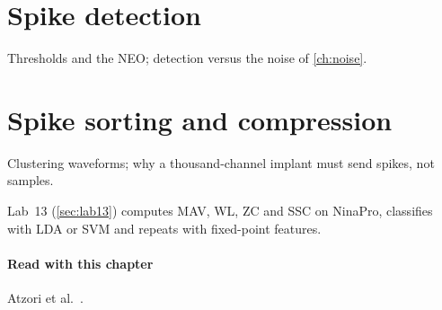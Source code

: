 \section{Spike detection}\label{sec:ch26-3}
Thresholds and the NEO; detection versus the noise of \cref{ch:noise}.

\section{Spike sorting and compression}\label{sec:ch26-4}
Clustering waveforms; why a thousand-channel implant must send spikes, not samples.

\begin{tryit}
Lab~13 (\cref{sec:lab13}) computes MAV, WL, ZC and SSC on NinaPro, classifies with LDA or SVM and repeats with fixed-point features.
\end{tryit}

\paragraph{Read with this chapter} Atzori et al.~\cite{ninapro}.
